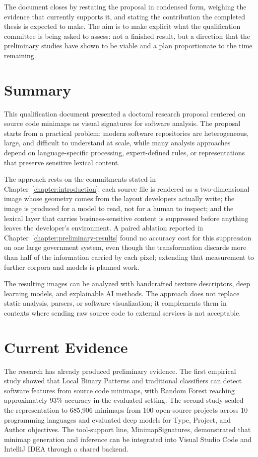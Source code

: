 The document closes by restating the proposal in condensed form, weighing the
evidence that currently supports it, and stating the contribution the completed
thesis is expected to make. The aim is to make explicit what the qualification
committee is being asked to assess: not a finished result, but a direction that
the preliminary studies have shown to be viable and a plan proportionate to the
time remaining.

\section{Summary}

This qualification document presented a doctoral research proposal centered on
source code minimaps as visual signatures for software analysis. The proposal
starts from a practical problem: modern software repositories are heterogeneous,
large, and difficult to understand at scale, while many analysis approaches
depend on language-specific processing, expert-defined rules, or representations
that preserve sensitive lexical content.

The approach rests on the commitments stated in
Chapter~\ref{chapter:introduction}: each source file is rendered as a
two-dimensional image whose geometry comes from the layout developers actually
write; the image is produced for a model to read, not for a human to inspect;
and the lexical layer that carries business-sensitive content is suppressed
before anything leaves the developer's environment. A paired ablation reported
in Chapter~\ref{chapter:preliminary-results} found no accuracy cost for this
suppression on one large government system, even though the transformation
discards more than half of the information carried by each pixel; extending
that measurement to further corpora and models is planned work.

The resulting images can be analyzed with handcrafted texture descriptors, deep
learning models, and explainable AI methods. The approach does not replace
static analysis, parsers, or software visualization; it complements them in
contexts where sending raw source code to external services is not acceptable.

\section{Current Evidence}

The research has already produced preliminary evidence. The first empirical
study showed that Local Binary Patterns and traditional classifiers can detect
software features from source code minimaps, with Random Forest reaching
approximately 93\% accuracy in the evaluated setting. The second study scaled
the representation to 685,906 minimaps from 100 open-source projects across 10
programming languages and evaluated deep models for Type, Project, and Author
objectives. The tool-support line, MinimapSignatures, demonstrated that minimap
generation and inference can be integrated into Visual Studio Code and IntelliJ
IDEA through a shared backend.

